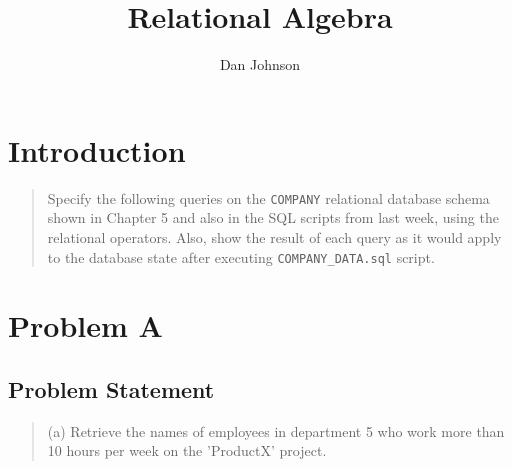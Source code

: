 \documentclass{article}
\title{Relational Algebra}
\author{Dan Johnson}
\begin{document}
\maketitle
\section{Introduction}
\begin{quotation}
  Specify the following queries on the \texttt{COMPANY} relational database schema shown in Chapter 5 and also in the SQL scripts from last week, using the relational operators. Also, show the result of each query as it would apply to the database state after executing \texttt{COMPANY_DATA.sql} script.
\end{quotation}
\section{Problem A}
\subsection{Problem Statement}
\begin{quotation}
(a) Retrieve the names of employees in department 5 who work more than 10 hours per week on the 'ProductX' project.
\end{quotation}
\end{document}
